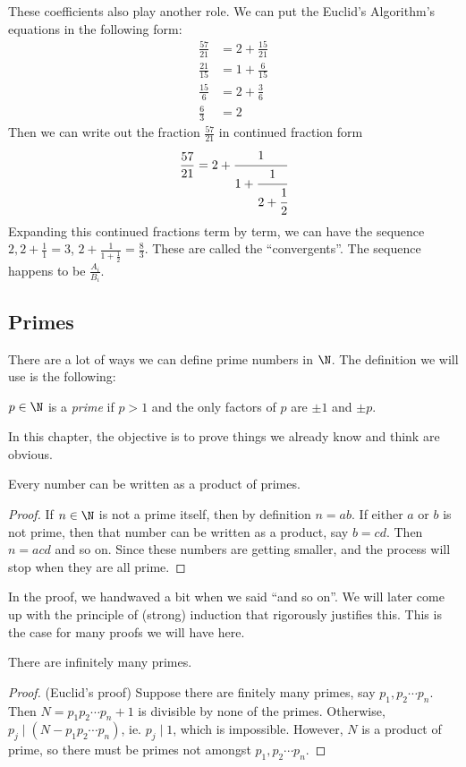 \documentclass[a4paper]{article}
\begin{document}
These coefficients also play another role. We can put the Euclid's Algorithm's equations in the following form:
\begin{align*}
  \frac{57}{21} &= 2 + \frac{15}{21}\\
  \frac{21}{15} &= 1 + \frac{6}{15}\\
  \frac{15}{6} &= 2 + \frac{3}{6}\\
  \frac{6}{3} &= 2
\end{align*}
Then we can write out the fraction $\frac{57}{21}$ in continued fraction form
\[
  \frac{57}{21} = 2 + \cfrac{1}{1 + \cfrac{1}{2 + \cfrac{1}{2}}}
\]
Expanding this continued fractions term by term, we can have the sequence $2, 2 + \frac{1}{1} = 3$, $2 + \frac{1}{1 + \frac{1}{2}} = \frac{8}{3}$. These are called the ``convergents''. The sequence happens to be $\frac{A_i}{B_i}$.

\subsection{Primes}
There are a lot of ways we can define prime numbers in $\N$. The definition we will use is the following:
\begin{defi}
  $p\in \N$ is a \emph{prime} if $p > 1$ and the only factors of $p$ are $\pm 1$ and $\pm p$.
\end{defi}
In this chapter, the objective is to prove things we already know and think are obvious.
\begin{thm}
  Every number can be written as a product of primes.
\end{thm}

\begin{proof}
  If $n\in \N$ is not a prime itself, then by definition $n = ab$. If either $a$ or $b$ is not prime, then that number can be written as a product, say $b = cd$. Then $n = acd$ and so on. Since these numbers are getting smaller, and the process will stop when they are all prime.
\end{proof}
In the proof, we handwaved a bit when we said ``and so on''. We will later come up with the principle of (strong) induction that rigorously justifies this. This is the case for many proofs we will have here.

\begin{thm}
  There are infinitely many primes.
\end{thm}

\begin{proof}
  (Euclid's proof) Suppose there are finitely many primes, say $p_1, p_2 \cdots p_n$. Then $N = p_1p_2\cdots p_n + 1$ is divisible by none of the primes. Otherwise, $p_j\mid (N - p_1p_2\cdots p_n)$, ie. $p_j\mid 1$, which is impossible. However, $N$ is a product of prime, so there must be primes not amongst $p_1, p_2\cdots p_n$.
\end{proof}
\end{document}
